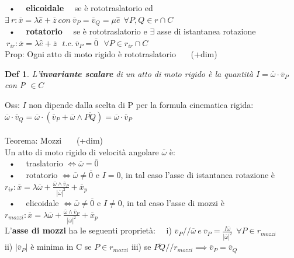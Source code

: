 \documentclass{article}
\theoremstyle{unnumbered}
\newtheorem* {theoremT}{Def}
\theoremstyle{unnumbered1}
\newenvironment{defi}{\begin{gBox}\begin{theoremT}}{\end{theoremT}\end{gBox}}
\begin{document}
\ • \ \ \textbf{elicoidale} \ \  se è rototraslatorio ed $\exists \ r: \overline{x}=\lambda\hat{e} + \overline{z} \ con \ \overline{v}_P = \overline{v}_Q = \mu \hat{e} \ \ \forall P,Q \in r\cap C$\\
\ • \ \ \textbf{rotatorio} \ \ se è rototraslatorio e $\exists$ asse di istantanea rotazione $ \ r_{ir}: \overline{x}=\lambda\hat{e} + \overline{z} \ \ \ t.c. \ \overline{v}_P = \overline{0} \ \ \ \forall P\in r_{ir} \cap C \ $ \\
%
Prop: Ogni atto di moto rigido è rototraslatorio \ \ \ (+dim)\\
%
%
%
\begin{defi}
L'\textbf{invariante scalare} di un atto di moto rigido è la quantità $I=\overline{\omega}\cdot\overline{v}_P$ con P $\in C$
\end{defi}
Oss: $I$ non dipende dalla scelta di P per la formula cinematica rigida: $\overline{\omega}\cdot\overline{v}_Q = \overline{\omega}\cdot(\overline{v}_P+\overline{\omega}\wedge\overline{PQ})=\overline{\omega}\cdot\overline{v}_P$\\ \\
%
%
Teorema: Mozzi \ \ \ (+dim) \\
\phantom{\ }Un atto di moto rigido di velocità angolare $\overline{\omega}$ è:\\
\ • \ \ traslatorio $\Longleftrightarrow \overline{\omega}=\overline{0}$ \\
\ • \ \ rotatorio $\Longleftrightarrow \overline{\omega} \neq \overline{0}$ e $I=0$, in tal caso l'asse di istantanea rotazione è $r_{ir}: \overline{x}=\lambda\overline{\omega} + \frac{\overline{\omega} \wedge \overline{v}_P}{|\overline{\omega}|^2}+\overline{x}_p $ \\
\ • \ \ elicoidale $\Longleftrightarrow \overline{\omega} \neq \overline{0} $ e $I\neq0$, in tal caso l'asse di mozzi è $r_{mozzi}: \overline{x}=\lambda\overline{\omega} + \frac{\overline{\omega} \wedge \overline{v}_P}{|\overline{\omega}|^2}+\overline{x}_p $\\
\phantom{\ }L'\textbf{asse di mozzi} ha le seguenti proprietà: \ \
i) $\overline{v}_P /\!\!/ \overline{\omega} \ e\ \overline{v}_P = \frac{I\overline{\omega}}{|\overline{\omega}|^2} \ \ \forall P \in r_{mozzi}$ \\
\phantom{\ }ii) $|\overline{v}_P|$ è minima in C se $P \in r_{mozzi}$ \hspace{0.42in}
iii) se $\overline{PQ} /\!\!/ r_{mozzi} \implies \overline{v}_P = \overline{v}_Q$ \\ \\
\end{document}
